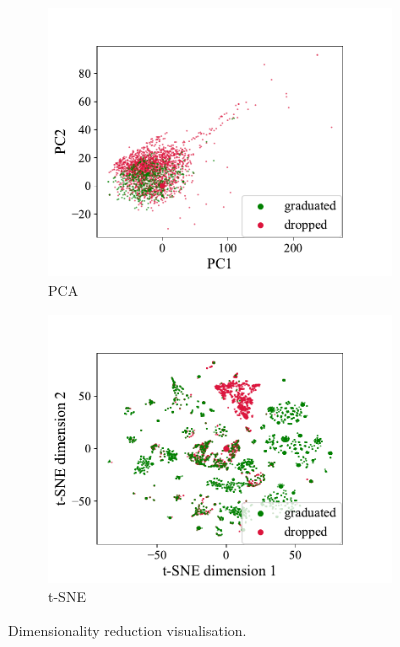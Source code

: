 \documentclass{article}
\begin{document}
\begin{figure}[t!]
  \centering 
  \begin{subfigure}{0.49\textwidth}
    \includegraphics[width=\linewidth]{../gfx/pca.pdf}
    \caption{PCA}
    \label{fig:pca}
  \end{subfigure} 
  \begin{subfigure}{0.49\textwidth}
    \includegraphics[width=\linewidth]{../gfx/tsne.pdf}
    \caption{t-SNE}
    \label{fig:tsne}
  \end{subfigure}
  \captionsetup{belowskip=-10pt}
  \caption{Dimensionality reduction visualisation.}
  \label{fig:reduction}
\end{figure}
\end{document}
